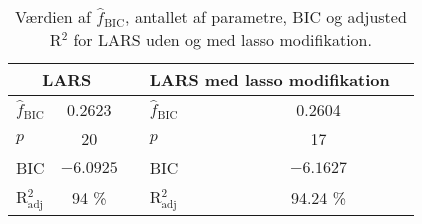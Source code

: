 \begin{table}
\center
\begin{tabular}{lcc | lcc} 
\toprule
\multicolumn{2}{c}{LARS}  & \multicolumn{1}{c}{ } & \multicolumn{2}{c}{LARS med lasso modifikation} \\ \midrule
$\widehat{f}_\text{BIC}$ & 0.2623 & &$\widehat{f}_\text{BIC}$ & 0.2604   \\
$p$ & 20 & & $p$ & 17  \\
BIC & $-6.0925$ && BIC & $-6.1627$  \\
R$^2_{\text{adj}}$&94 \% & & R$^2_{\text{adj}}$& 94.24 \% \\ \bottomrule
 \end{tabular}
\caption{Værdien af $\widehat{f}_\text{BIC}$, antallet af parametre, BIC og adjusted  R$^2$ for LARS uden og med lasso modifikation.} \label{tab:bic_lars}
\end{table}